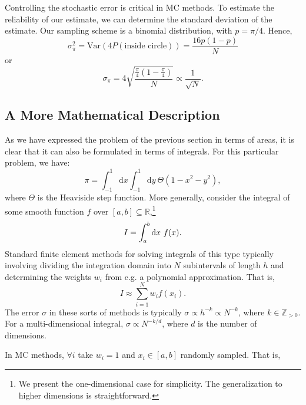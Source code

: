 Controlling the stochastic error is critical in \gls{MC} methods. To estimate the reliability of our estimate, we can determine the standard deviation of the estimate. Our sampling scheme is a binomial distribution, with $p=\pi/4$. Hence,
\begin{equation}
    \sigma^2_{\pi} = \mathrm{Var}(4P(\text{inside circle})) = \frac{16p(1-p)}{N}
\end{equation}
or
\begin{equation}
    \sigma_\pi
    = 4\sqrt{\frac{\frac \pi 4 (1-\frac \pi 4)}N}
    \propto \frac{1}{\sqrt{N}}.
\end{equation}

\subsection{A More Mathematical Description}

As we have expressed the problem of the previous section in terms of areas, it is clear that it can also be formulated in terms of integrals. For this particular problem, we have:
\begin{equation}
    \pi = \int_{-1}^1  \mathrm{d}x \int_{-1}^1 \mathrm{d}y\ \Theta(1-x^2-y^2) ,
\end{equation}
where $\Theta$ is the Heaviside step function.
More generally, consider the integral of some smooth function $f$ over $[a,b]\subseteq \mathbb{R}$,\footnote{We present the one-dimensional case for simplicity. The generalization to higher dimensions is straightforward.}
\begin{equation}
    I = \int_a^b \mathrm{d} x \ f(x).
\end{equation}
Standard finite element methods for solving integrals of this type typically involving dividing the integration domain into $N$ subintervals of length $h$ and determining the weights $w_i$ from e.g. a polynomial approximation. That is,
\begin{equation}
I \approx \sum_{i=1}^N w_if(x_i).
\end{equation}
The error $\sigma$ in these sorts of methods is typically $\sigma\propto h^{-k} \propto N^{-k}$, where $k\in\mathbb{Z}_{>0}$. For a multi-dimensional integral, $\sigma\propto N^{-k/d}$, where $d$ is the number of dimensions.\cite{ascherFirst2011}

In \gls{MC} methods, $\forall i$ take $w_i=1$ and $x_i\in[a,b]$ randomly sampled. That is,

